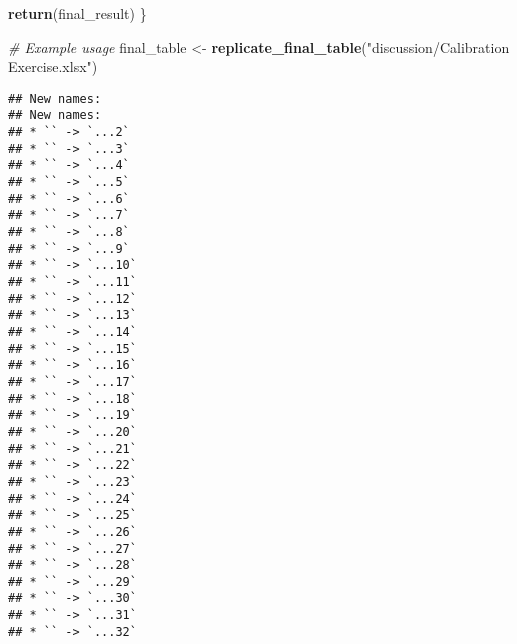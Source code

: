 \documentclass[
]{article}
\newenvironment{Shaded}{\begin{snugshade}}{\end{snugshade}}
\newcommand{\CommentTok}[1]{\textcolor[rgb]{0.56,0.35,0.01}{\textit{#1}}}
\newcommand{\FunctionTok}[1]{\textcolor[rgb]{0.13,0.29,0.53}{\textbf{#1}}}
\newcommand{\NormalTok}[1]{#1}
\newcommand{\OtherTok}[1]{\textcolor[rgb]{0.56,0.35,0.01}{#1}}
\newcommand{\StringTok}[1]{\textcolor[rgb]{0.31,0.60,0.02}{#1}}
\begin{document}
\begin{Shaded}
\begin{Highlighting}[]
  \FunctionTok{return}\NormalTok{(final\_result)}
\NormalTok{\}}

\CommentTok{\# Example usage}
\NormalTok{final\_table }\OtherTok{\textless{}{-}} \FunctionTok{replicate\_final\_table}\NormalTok{(}\StringTok{"discussion/Calibration Exercise.xlsx"}\NormalTok{)}
\end{Highlighting}
\end{Shaded}

\begin{verbatim}
## New names:
## New names:
## * `` -> `...2`
## * `` -> `...3`
## * `` -> `...4`
## * `` -> `...5`
## * `` -> `...6`
## * `` -> `...7`
## * `` -> `...8`
## * `` -> `...9`
## * `` -> `...10`
## * `` -> `...11`
## * `` -> `...12`
## * `` -> `...13`
## * `` -> `...14`
## * `` -> `...15`
## * `` -> `...16`
## * `` -> `...17`
## * `` -> `...18`
## * `` -> `...19`
## * `` -> `...20`
## * `` -> `...21`
## * `` -> `...22`
## * `` -> `...23`
## * `` -> `...24`
## * `` -> `...25`
## * `` -> `...26`
## * `` -> `...27`
## * `` -> `...28`
## * `` -> `...29`
## * `` -> `...30`
## * `` -> `...31`
## * `` -> `...32`
\end{verbatim}
\end{document}
